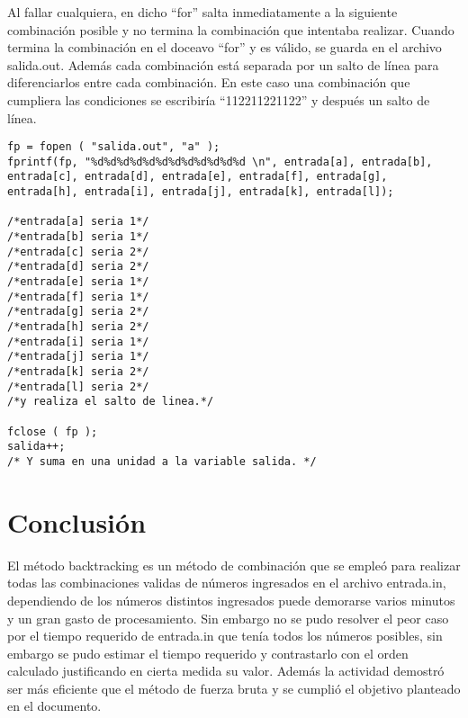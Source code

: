 \documentclass[9pt,twocolumn,twoside]{optica}
\begin{document}
Al fallar cualquiera, en dicho “for” salta inmediatamente a la siguiente combinación posible y no termina la combinación que intentaba realizar.
Cuando termina la combinación en el doceavo “for” y es válido, se guarda en el archivo salida.out. Además cada combinación está separada por un salto de línea para diferenciarlos entre cada combinación. En este caso una combinación que cumpliera las condiciones se escribiría “112211221122” y después un salto de línea.


\lstset{language=C, breaklines=true, basicstyle=\footnotesize}
\begin{lstlisting}[frame=single]
fp = fopen ( "salida.out", "a" );
fprintf(fp, "%d%d%d%d%d%d%d%d%d%d%d%d \n", entrada[a], entrada[b], entrada[c], entrada[d], entrada[e], entrada[f], entrada[g], entrada[h], entrada[i], entrada[j], entrada[k], entrada[l]);
                                                                                                
/*entrada[a] seria 1*/
/*entrada[b] seria 1*/
/*entrada[c] seria 2*/
/*entrada[d] seria 2*/
/*entrada[e] seria 1*/
/*entrada[f] seria 1*/
/*entrada[g] seria 2*/
/*entrada[h] seria 2*/
/*entrada[i] seria 1*/
/*entrada[j] seria 1*/
/*entrada[k] seria 2*/
/*entrada[l] seria 2*/
/*y realiza el salto de linea.*/

fclose ( fp );                                                                                  salida++;
/* Y suma en una unidad a la variable salida. */
\end{lstlisting}

\section{Conclusión}

El método backtracking es un método de combinación que se empleó para realizar todas las combinaciones validas de números ingresados en el archivo entrada.in, dependiendo de los números distintos ingresados puede demorarse varios minutos y un gran gasto de procesamiento.
Sin embargo no se pudo resolver el peor caso por el tiempo requerido de entrada.in que tenía todos los números posibles, sin embargo se pudo estimar el tiempo requerido y contrastarlo con el orden calculado justificando en cierta medida su valor.
Además la actividad demostró ser más eficiente que el método de fuerza bruta y se cumplió el objetivo planteado en el documento.




\end{document}
